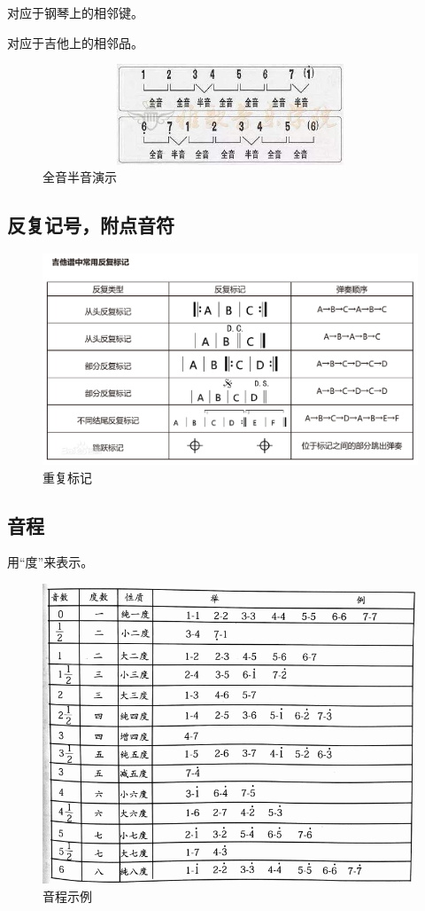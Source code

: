 \documentclass[UTF8,a4paper,12pt]{ctexbook}
\begin{document}
			对应于钢琴上的相邻键。
			
			对应于吉他上的相邻品。
			
			\begin{figure}[H]
				\centering
				\includegraphics[width=15cm,height=3cm]{timg.jpg}
				\caption{全音半音演示}
			\end{figure}
			
			
		\subsection*{反复记号，附点音符}
			\begin{figure}[H]
				\centering
				\includegraphics[scale=0.34]{repeat}
				\caption{重复标记}
			\end{figure}
			
		\newpage
		\subsection*{音程}
			用“度”来表示。
			
			\begin{figure}[H]
				\centering
				\includegraphics[width=0.97\linewidth]{figure/yincheng}
				\caption{音程示例}
				\label{fig:yincheng}
			\end{figure}
			
\end{document}
